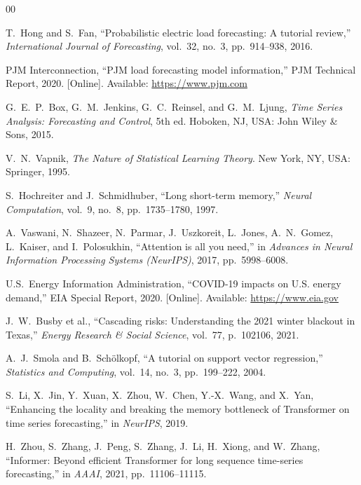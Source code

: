 \documentclass[conference, 10pt]{IEEEtran}
\begin{document}
\begin{thebibliography}{00}

T.~Hong and S.~Fan, ``Probabilistic electric load forecasting: A tutorial review,'' \textit{International Journal of Forecasting}, vol.~32, no.~3, pp.~914--938, 2016.

PJM Interconnection, ``PJM load forecasting model information,'' PJM Technical Report, 2020. [Online]. Available: \url{https://www.pjm.com}

G.~E.~P.~Box, G.~M.~Jenkins, G.~C.~Reinsel, and G.~M.~Ljung, \textit{Time Series Analysis: Forecasting and Control}, 5th ed. Hoboken, NJ, USA: John Wiley \& Sons, 2015.

V.~N.~Vapnik, \textit{The Nature of Statistical Learning Theory}. New York, NY, USA: Springer, 1995.

S.~Hochreiter and J.~Schmidhuber, ``Long short-term memory,'' \textit{Neural Computation}, vol.~9, no.~8, pp.~1735--1780, 1997.

A.~Vaswani, N.~Shazeer, N.~Parmar, J.~Uszkoreit, L.~Jones, A.~N.~Gomez, L.~Kaiser, and I.~Polosukhin, ``Attention is all you need,'' in \textit{Advances in Neural Information Processing Systems (NeurIPS)}, 2017, pp.~5998--6008.

U.S.~Energy Information Administration, ``COVID-19 impacts on U.S. energy demand,'' EIA Special Report, 2020. [Online]. Available: \url{https://www.eia.gov}

J.~W.~Busby et al., ``Cascading risks: Understanding the 2021 winter blackout in Texas,'' \textit{Energy Research \& Social Science}, vol.~77, p.~102106, 2021.

A.~J.~Smola and B.~Sch{\"o}lkopf, ``A tutorial on support vector regression,'' \textit{Statistics and Computing}, vol.~14, no.~3, pp.~199--222, 2004.

S.~Li, X.~Jin, Y.~Xuan, X.~Zhou, W.~Chen, Y.-X.~Wang, and X.~Yan, ``Enhancing the locality and breaking the memory bottleneck of Transformer on time series forecasting,'' in \textit{NeurIPS}, 2019.

H.~Zhou, S.~Zhang, J.~Peng, S.~Zhang, J.~Li, H.~Xiong, and W.~Zhang, ``Informer: Beyond efficient Transformer for long sequence time-series forecasting,'' in \textit{AAAI}, 2021, pp.~11106--11115.


\end{thebibliography}
\end{document}
